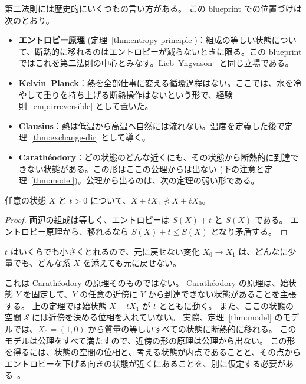 第二法則には歴史的にいくつもの言い方がある。
この blueprint での位置づけは次のとおり。
\begin{itemize}
  \item \textbf{エントロピー原理} (定理~\ref{thm:entropy-principle})：組成の等しい状態について、断熱的に移れるのはエントロピーが減らないときに限る。この blueprint ではこれを第二法則の中心とみなす。Lieb--Yngvason~\cite{LY99} と同じ立場である。
  \item \textbf{Kelvin--Planck}：熱を全部仕事に変える循環過程はない。ここでは、水を冷やして重りを持ち上げる断熱操作はないという形で、経験則~\ref{emp:irreversible} として置いた。
  \item \textbf{Clausius}：熱は低温から高温へ自然には流れない。温度を定義した後で定理~\ref{thm:exchange-dir} として導く。
  \item \textbf{Carathéodory}：どの状態のどんな近くにも、その状態から断熱的に到達できない状態がある。この形はここの公理からは出ない (下の注意と定理~\ref{thm:model})。公理から出るのは、次の定理の弱い形である。
\end{itemize}

\begin{theorem}[少量の補助系を添えても不可逆]
  \label{thm:caratheodory}
  \leanok
  任意の状態 $X$ と $t > 0$ について、$X + tX_1 \not\prec X + tX_0$。
\end{theorem}

\begin{proof}
  \leanok
  両辺の組成は等しく、エントロピーは $S(X) + t$ と $S(X)$ である。
  エントロピー原理から、移れるなら $S(X) + t \le S(X)$ となり矛盾する。
\end{proof}

$t$ はいくらでも小さくとれるので、元に戻せない変化 $X_0 \to X_1$ は、どんなに少量でも、どんな系 $X$ を添えても元に戻せない。

これは Carathéodory の原理そのものではない。
Carathéodory の原理は、始状態 $Y$ を固定して、$Y$ の任意の近傍に $Y$ から到達できない状態があることを主張する。
上の定理では始状態 $X + tX_1$ が $t$ とともに動く。
また、ここの状態の空間 $\mathcal{S}$ には近傍を決める位相を入れていない。
実際、定理~\ref{thm:model} のモデルでは、$X_0 = (1, 0)$ から質量の等しいすべての状態に断熱的に移れる。
このモデルは公理をすべて満たすので、近傍の形の原理は公理から出ない。
この形を得るには、状態の空間の位相と、考える状態が内点であることと、その点からエントロピーを下げる向きの状態が近くにあることを、別に仮定する必要がある~\cite{LY99}。


